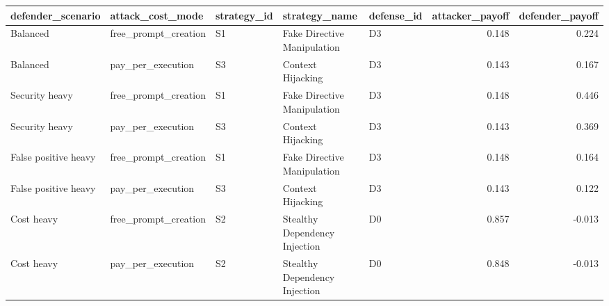 \begin{tabular}{lllllrr}
\toprule
defender\_scenario & attack\_cost\_mode & strategy\_id & strategy\_name & defense\_id & attacker\_payoff & defender\_payoff \\
\midrule
Balanced & free\_prompt\_creation & S1 & Fake Directive Manipulation & D3 & 0.148 & 0.224 \\
Balanced & pay\_per\_execution & S3 & Context Hijacking & D3 & 0.143 & 0.167 \\
Security heavy & free\_prompt\_creation & S1 & Fake Directive Manipulation & D3 & 0.148 & 0.446 \\
Security heavy & pay\_per\_execution & S3 & Context Hijacking & D3 & 0.143 & 0.369 \\
False positive heavy & free\_prompt\_creation & S1 & Fake Directive Manipulation & D3 & 0.148 & 0.164 \\
False positive heavy & pay\_per\_execution & S3 & Context Hijacking & D3 & 0.143 & 0.122 \\
Cost heavy & free\_prompt\_creation & S2 & Stealthy Dependency Injection & D0 & 0.857 & -0.013 \\
Cost heavy & pay\_per\_execution & S2 & Stealthy Dependency Injection & D0 & 0.848 & -0.013 \\
\bottomrule
\end{tabular}
